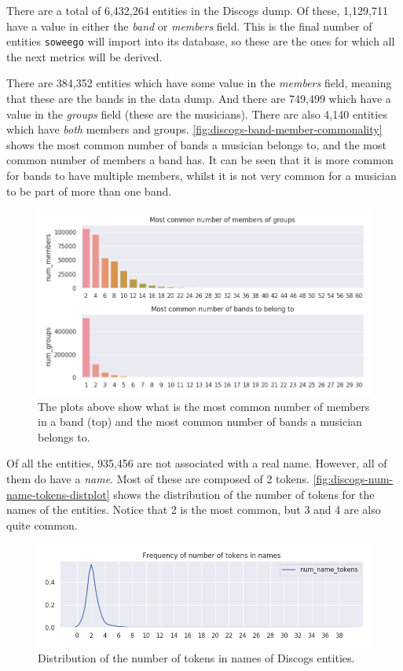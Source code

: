 \documentclass[epsfig,a4paper,11pt,titlepage,twoside,openany]{book}
\begin{document}
There are a total of 6,432,264 entities in the Discogs dump. Of these, 1,129,711 have a value in either the \textit{band} or \textit{members} field. This is the final number of entities \texttt{soweego} will import into its database, so these are the ones for which all the next metrics will be derived.

There are 384,352 entities which have some value in the \textit{members} field, meaning that these are the bands in the data dump. And there are 749,499 which have a value in the \textit{groups} field (these are the musicians). There are also 4,140 entities which have \textit{both} members and groups. \autoref{fig:discogs-band-member-commonality} shows the most common number of bands a musician belongs to, and the most common number of members a band has. It can be seen that it is more common for bands to have multiple members, whilst it is not very common for a musician to be part of more than one band.

\begin{figure}[]
  \centering \includegraphics[width=\textwidth]{discogs_band_belonging_barplots} 
  \caption{The plots above show what is the most common number of members in a band (top) and the most common number of bands a musician belongs to.}
  \label{fig:discogs-band-member-commonality}
\end{figure}


Of all the entities, 935,456 are not associated with a real name. However, all of them do have a \textit{name}. Most of these are composed of 2 tokens. \autoref{fig:discogs-num-name-tokens-distplot} shows the distribution of the number of tokens for the names of the entities. Notice that 2 is the most common, but 3 and 4 are also quite common.

\begin{figure}[]
  \centering \includegraphics[width=\textwidth]{discogs_distribution_num_name_tokens} 
  \caption{Distribution of the number of tokens in names of Discogs entities.}
  \label{fig:discogs-num-name-tokens-distplot}
\end{figure}
\end{document}
